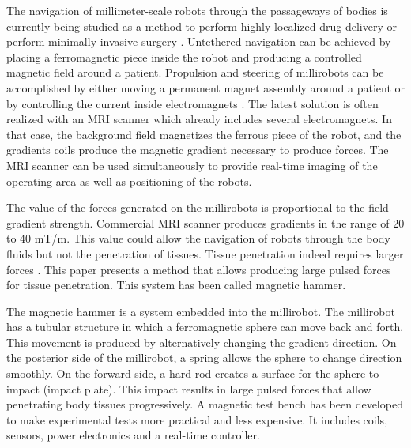 \documentclass[letterpaper, 10 pt, conference]{ieeeconf}  %
\begin{document}
The navigation of millimeter-scale robots through the passageways of bodies is currently being studied as a method to perform highly localized drug delivery or perform minimally invasive surgery \cite{7067029,702,mi2020295}. Untethered navigation can be achieved by placing a ferromagnetic piece inside the robot and producing a controlled magnetic field around a patient. Propulsion and steering of millirobots can be accomplished by either moving a permanent magnet assembly around a patient \cite{taylor} or by controlling the current inside electromagnets \cite{MRM21638}. The latest solution is often realized with an MRI scanner which already includes several electromagnets. In that case, the background field magnetizes the ferrous piece of the robot, and the gradients coils produce the magnetic gradient necessary to produce forces. The MRI scanner can be used simultaneously to provide real-time imaging of the operating area as well as positioning of the robots.\par
The value of the forces generated on the millirobots is proportional to the field gradient strength. Commercial MRI scanner produces gradients in the range of 20 to 40 mT/m. This value could allow the navigation of robots through the body fluids but not the penetration of tissues. Tissue penetration indeed requires larger forces \cite{7139341}. This paper presents a method that allows producing large pulsed forces for tissue penetration. This system has been called magnetic hammer.\par
The magnetic hammer is a system embedded into the millirobot. The millirobot has a tubular structure in which a ferromagnetic sphere can move back and forth. This movement is produced by alternatively changing the gradient direction. On the posterior side of the millirobot, a spring allows the sphere to change direction smoothly. On the forward side, a hard rod creates a surface for the sphere to impact (impact plate). This impact results in large pulsed forces that allow penetrating body tissues progressively.
A magnetic test bench has been developed to make experimental tests more practical and less expensive. It includes coils, sensors, power electronics and a real-time controller.\par
\end{document}
